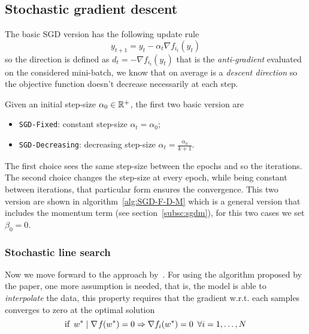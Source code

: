 

\subsection{Stochastic gradient descent}\label{subsc:sgd}

The basic SGD version has the following update rule
\begin{equation}\label{eq:sgd-base}
y_{t+1}=y_t-\alpha_t\nabla f_{i_t}(y_t)
\end{equation}
so the direction is defined as $d_t=-\nabla f_{i_t}(y_t)$ that is the \emph{anti-gradient} evaluated on the considered mini-batch, we know that on average is a \emph{descent direction} so the objective function doesn't decrease necessarily at each step.

Given an initial step-size $\alpha_0\in\mathbb{R}^+$, the first two basic version are 
\begin{itemize}
\item \texttt{SGD-Fixed}: constant step-size $\alpha_t=\alpha_0$;
\item \texttt{SGD-Decreasing}: decreasing step-size $\alpha_t=\frac{\alpha_0}{k+1}$.
\end{itemize}
The first choice sees the same step-size between the epochs and so the iterations. The second choice changes the step-size at every epoch, while being constant between iterations, that particular form ensures the convergence. This two version are shown in algorithm~\vref{alg:SGD-F-D-M} which is a general version that includes the momentum term (see section~\ref{subsc:sgdm}), for this two cases we set $\beta_0=0$.

\subsubsection{Stochastic line search}

Now we move forward to the approach by~\textcite{vaswani_painless_2019}. For using the algorithm proposed by the paper, one more assumption is needed, that is, the model is able to \emph{interpolate} the data, this property requires that the gradient w.r.t. each samples converges to zero at the optimal solution
\[
\text{if}\,\,\,w^\ast\mid\nabla\operatorname*{\mathit{f}}(w^\ast)=0\Rightarrow\nabla f_i(w^\ast)=0\,\,\,\forall i=1,\dots,N
\]

